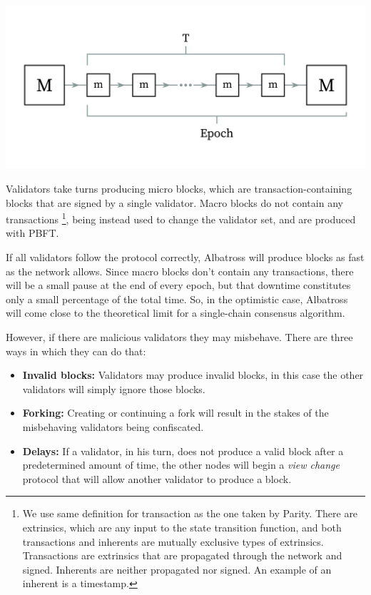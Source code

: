 \documentclass[conference]{IEEEtran}
\begin{document}
\includegraphics[width=\linewidth]{images/albatross.jpg}

Validators take turns producing micro blocks, which are transaction-containing blocks that are signed by a single validator. Macro blocks do not contain any transactions \footnote{We use same definition for transaction as the one taken by Parity. There are extrinsics, which are any input to the state transition function, and both transactions and inherents are mutually exclusive types of extrinsics. Transactions are extrinsics that are propagated through the network and signed. Inherents are neither propagated nor signed. An example of an inherent is a timestamp.}, being instead used to change the validator set, and are produced with PBFT.

If all validators follow the protocol correctly, Albatross will produce blocks as fast as the network allows. Since macro blocks don't contain any transactions, there will be a small pause at the end of every epoch, but that downtime constitutes only a small percentage of the total time. So, in the optimistic case, Albatross will come close to the theoretical limit for a single-chain consensus algorithm.

However, if there are malicious validators they may misbehave. There are three ways in which they can do that:

\begin{itemize}
	\item \textbf{Invalid blocks:} Validators may produce invalid blocks, in this case the other validators will simply ignore those blocks.
	\item \textbf{Forking:} Creating or continuing a fork will result in the stakes of the misbehaving validators being confiscated.
	\item \textbf{Delays:} If a validator, in his turn, does not produce a valid block after a predetermined amount of time, the other nodes will begin a \textit{view change} protocol that will allow another validator to produce a block.
\end{itemize}
\end{document}
